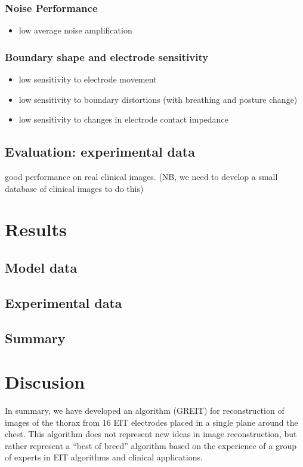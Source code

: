 \documentclass[letterpaper,twocolumn,11pt]{article}
\begin{document}
\subsubsection{ Noise Performance}
   \begin{itemize}
   \item low average noise amplification
   \end{itemize}

\subsubsection{ Boundary shape and electrode sensitivity}
   \begin{itemize}
   \item low sensitivity to electrode movement
   \item low sensitivity to boundary distortions
         (with breathing and posture change)
   \item low sensitivity to changes in electrode contact impedance
   \end{itemize}


\subsection{Evaluation: experimental data}


 good performance on real clinical images.
     (NB, we need to develop a small database of 
          clinical images to do this)

\section{Results}
\subsection{Model data}
\subsection{Experimental data}
\subsection{Summary}
\section{Discusion}

In summary, we have developed an algorithm (GREIT)
for reconstruction of images of the thorax
from 16 EIT electrodes placed in a single plane
around the chest. This algorithm does not represent
new ideas in image reconstruction, but rather represent
a ``best of breed'' algorithm based on the experience
of a group of experts in EIT algorithms and clinical
applications.
\end{document}
